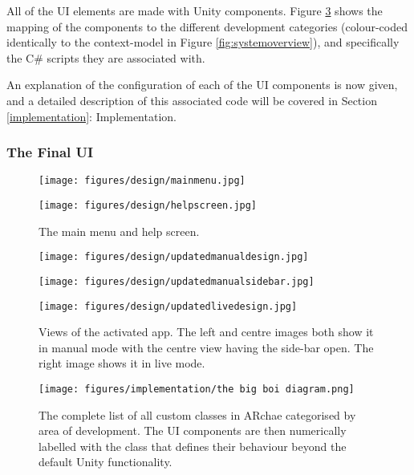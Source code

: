 \documentclass[12pt, a4paper]{article}
\begin{document}
All of the UI elements are made with Unity components. Figure \ref{fig:bigboi} shows the mapping of the components to the different development categories (colour-coded identically to the context-model in Figure \ref{fig:systemoverview}), and specifically the C\# scripts they are associated with.

An explanation of the configuration of each of the UI components is now given, and a detailed description of this associated code will be covered in Section \ref{implementation}: Implementation.

\newpage
\subsubsection*{ \centering The Final UI}
\vspace{1cm}
\begin{figure}[H]
\begin{minipage}{.5\textwidth}
  \raggedleft
  \texttt{[image: figures/design/mainmenu.jpg]}
\end{minipage}
\begin{minipage}{.5\textwidth}
  \raggedright
  \texttt{[image: figures/design/helpscreen.jpg]}
\end{minipage}
\caption{The main menu and help screen.}
\label{fig:menuandhelp}
\end{figure}

\begin{figure}[H]
    \begin{minipage}{.325\textwidth}
      \texttt{[image: figures/design/updatedmanualdesign.jpg]}
    \end{minipage}
    \begin{minipage}{.325\textwidth}
      \texttt{[image: figures/design/updatedmanualsidebar.jpg]}
    \end{minipage}
    \begin{minipage}{.325\textwidth}
      \texttt{[image: figures/design/updatedlivedesign.jpg]}
    \end{minipage}
  \caption{Views of the activated app. The left and centre images both show it in manual mode with the centre view having the side-bar open. The right image shows it in live mode.}
  \label{fig:manualview}
\end{figure}

\begin{figure}[H]
    \centering
    \texttt{[image: figures/implementation/the big boi diagram.png]}
        \caption{The complete list of all custom classes in ARchae categorised by area of development. The UI components are then numerically labelled with the class that defines their behaviour beyond the default Unity functionality.}
        \label{fig:bigboi}
\end{figure}
\end{document}
